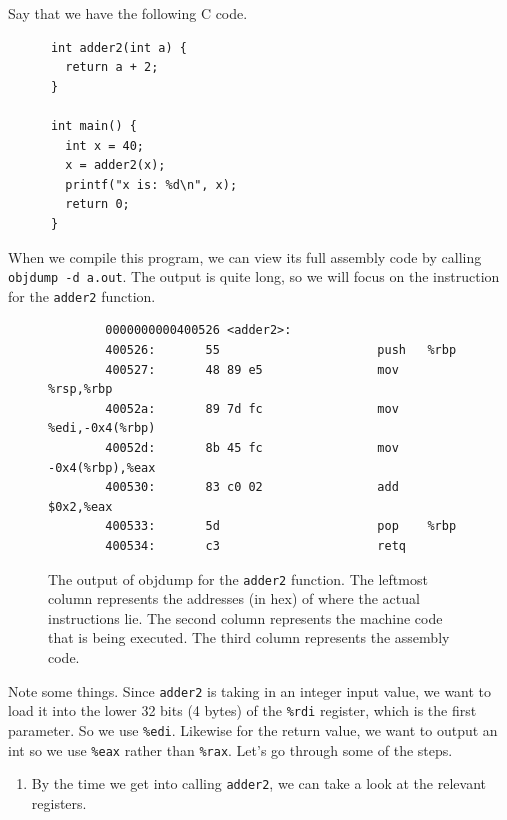   \begin{example}
    \label{ex:evaluating-a-function}
    Say that we have the following C code. 
    \begin{lstlisting}
      int adder2(int a) {
        return a + 2; 
      }

      int main() {
        int x = 40; 
        x = adder2(x); 
        printf("x is: %d\n", x);
        return 0; 
      }
    \end{lstlisting}
    When we compile this program, we can view its full assembly code by calling \texttt{objdump -d a.out}. The output is quite long, so we will focus on the instruction for the \texttt{adder2} function. 
    \begin{figure}[H]
      \centering 
      \begin{lstlisting}
        0000000000400526 <adder2>:
        400526:       55                      push   %rbp
        400527:       48 89 e5                mov    %rsp,%rbp
        40052a:       89 7d fc                mov    %edi,-0x4(%rbp)
        40052d:       8b 45 fc                mov    -0x4(%rbp),%eax
        400530:       83 c0 02                add    $0x2,%eax
        400533:       5d                      pop    %rbp
        400534:       c3                      retq
      \end{lstlisting}
      \caption{The output of objdump for the \texttt{adder2} function. The leftmost column represents the addresses (in hex) of where the actual instructions lie. The second column represents the machine code that is being executed. The third column represents the assembly code.}
      \label{fig:adder2} 
    \end{figure}
    Note some things. Since \texttt{adder2} is taking in an integer input value, we want to load it into the lower 32 bits (4 bytes) of the \texttt{\%rdi} register, which is the first parameter. So we use \texttt{\%edi}. Likewise for the return value, we want to output an int so we use \texttt{\%eax} rather than \texttt{\%rax}. Let's go through some of the steps. 
    \begin{enumerate}
      \item By the time we get into calling \texttt{adder2}, we can take a look at the relevant registers. 


\end{enumerate}
\end{example}
